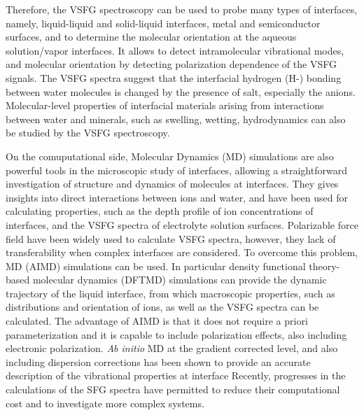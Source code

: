 Therefore, the VSFG spectroscopy can be used to probe many types of interfaces, namely, liquid-liquid and 
solid-liquid interfaces\cite{Guyot-Sionnest1987,RS91,DuQ1993,DuQ1994,Richmond2002,Gopalakrishnan2006,ShenYR2006,Morita2008}, metal and semiconductor surfaces\cite{Harris87,Superfine88},
and to determine the molecular orientation at the aqueous solution/vapor interfaces.
It allows to detect intramolecular vibrational modes, and molecular orientation by detecting polarization dependence of the VSFG signals\cite{Vidal05}.  
The VSFG spectra suggest that the interfacial hydrogen (H-) bonding between water molecules is changed by the presence of salt, 
especially the anions\cite{Raymond2004}.
Molecular-level properties of interfacial materials arising from interactions between water and minerals, 
such as swelling, wetting, hydrodynamics can also be studied by the VSFG spectroscopy\cite{Rotenberg14}.

On the comuputational side, Molecular Dynamics (MD) simulations are also powerful tools in the microscopic study of interfaces,
allowing a straightforward investigation of structure and dynamics of molecules at interfaces\cite{Morita2008}.
They gives insights into direct interactions between ions and water, and have been used for calculating properties, 
such as the depth profile of ion concentrations of interfaces\cite{Jungwirth2001,Jungwirth2002}, and the VSFG spectra 
of electrolyte solution surfaces\cite{Gopalakrishnan2006,Johnson2014,Ishiyama2014,Ishiyama2017}.
Polarizable force field have been widely used to calculate VSFG spectra\cite{LXD03,Petersen2004,TI07,MM05}, however, they lack
of transferability when complex interfaces are considered.
To overcome this problem, \abinitio MD (AIMD) simulations\cite{CP1985,Pastore1991,Hutter2012} can be used.
In particular density functional theory-based molecular dynamics (DFTMD) simulations\cite{CP1985,Kuehne2020} 
can provide the dynamic trajectory of 
the liquid interface, from which macroscopic properties, such as distributions and
orientation of ions, as well as the VSFG spectra can be calculated.  
The advantage of AIMD is that it does not require a priori parameterization and it is capable to include polarization effects\cite{Ufimtsev2011},
also including electronic polarization. \emph{Ab initio} MD at the gradient corrected level, and also including dispersion corrections\cite{Grimme2004,Grimme2006,Grimme2007,Grimme2010,Baer2011}
has been shown to provide an accurate description of the vibrational properties at interface
\cite{LeeCM2013,LeeCM2015,Sulpizi2013,Ohto2015,TO15,Fornaro2015, Khatib2016, Nagata2016, Ohto2016, Nagata2016b, Hosseinpour2017,Santos2018,Ohto2018}
Recently, progresses in the calculations of the SFG spectra have permitted to reduce their computational cost and to investigate more complex systems\cite{Khatib2016b,Khatib2017}.

